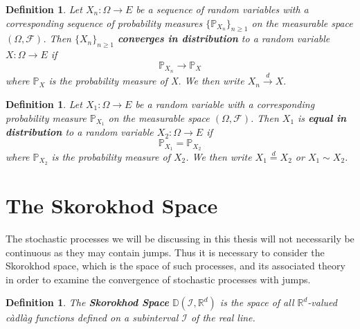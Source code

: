 \documentclass[honours,12pt]{UNSWthesis}
\newcommand{\R}{\mathbb{R}}
\newcommand{\PP}{\mathbb{P}}
\newcommand{\1}{\mathbf 1}
\newcommand{\FF}{\mathcal{F}}
\newcommand{\D}{\mathbb{D}}
\newtheorem{definition}[theorem]{Definition}
\numberwithin{equation}{section}
\theoremstyle{definition}
\theoremstyle{remark}
\begin{document}
\begin{definition}
Let $X_n:\Omega\to E$ be a sequence of random variables with a corresponding sequence of probability measures $\{\PP_{X_n}\}_{n\geq 1}$ on the measurable space $(\Omega, \FF)$. Then $\{X_n\}_{n\geq 1}$ \textbf{converges in distribution} to a random variable $X:\Omega\to E$ if 
\[
\PP_{X_n} \to \PP_X
\] where $\PP_X$ is the probability measure of X. We then write $X_n \overset{d}{\to}X.$\\
\end{definition}

\begin{definition}\label{def:equalDist}
Let $X_1:\Omega\to E$ be a  random variable with a corresponding probability measure $\PP_{X_1}$ on the measurable space $(\Omega, \FF)$. Then $X_1$ is \textbf{equal in distribution} to a random variable $X_2:\Omega\to E$ if 
\[\PP_{X_1} = \PP_{X_2} \] where $\PP_{X_2}$ is the probability measure of $X_2$. We then write $X_1 \overset{d}{=}X_2$ or $X_1 \sim X_2$.\\
\end{definition}

\section{The Skorokhod Space}
The stochastic processes we will be discussing in this thesis will not necessarily be continuous as they may contain jumps. Thus it is necessary to consider the Skorokhod space, which is the space of such processes, and its associated theory in order to examine the convergence of stochastic processes with jumps.\\
\begin{definition}
	The \textbf{Skorokhod Space} $\D(\mathcal{I},\R^d)$ is the space of all $\R^d$-valued c\`{a}dl\`{a}g functions defined on a subinterval $\mathcal{I}$ of the real line.\\
\end{definition}
\end{document}
